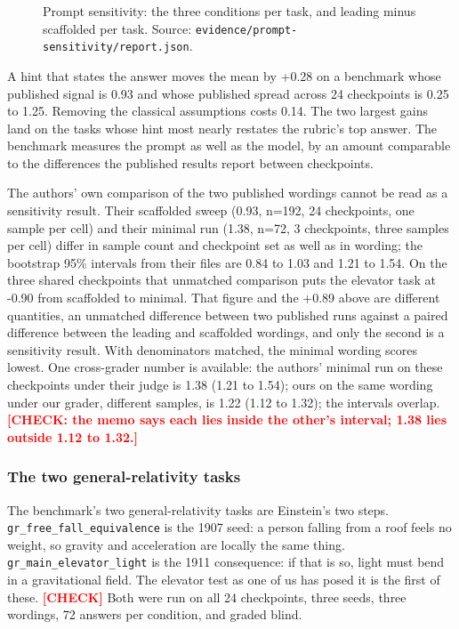 \documentclass[reprint,prx,amsmath,amssymb,aps,superscriptaddress]{revtex4-2}
\begin{document}
\begin{figure}[t]
\centering
{}
\caption{Prompt sensitivity: the three conditions per task, and leading minus scaffolded per task. Source: \texttt{evidence/prompt-sensitivity/report.json}.}
\label{fig:4}
\end{figure}

A hint that states the answer moves the mean by +0.28 on a benchmark whose published signal is 0.93 and whose published spread across 24 checkpoints is 0.25 to 1.25. Removing the classical assumptions costs 0.14. The two largest gains land on the tasks whose hint most nearly restates the rubric's top answer. The benchmark measures the prompt as well as the model, by an amount comparable to the differences the published results report between checkpoints.

The authors' own comparison of the two published wordings cannot be read as a sensitivity result. Their scaffolded sweep (0.93, n=192, 24 checkpoints, one sample per cell) and their minimal run (1.38, n=72, 3 checkpoints, three samples per cell) differ in sample count and checkpoint set as well as in wording; the bootstrap 95\% intervals from their files are 0.84 to 1.03 and 1.21 to 1.54. On the three shared checkpoints that unmatched comparison puts the elevator task at -0.90 from scaffolded to minimal. That figure and the +0.89 above are different quantities, an unmatched difference between two published runs against a paired difference between the leading and scaffolded wordings, and only the second is a sensitivity result. With denominators matched, the minimal wording scores lowest. One cross-grader number is available: the authors' minimal run on these checkpoints under their judge is 1.38 (1.21 to 1.54); ours on the same wording under our grader, different samples, is 1.22 (1.12 to 1.32); the intervals overlap. \textbf{\textcolor{red}{[CHECK: the memo says each lies inside the other's interval; 1.38 lies outside 1.12 to 1.32.]}}

\subsubsection{The two general-relativity tasks}

The benchmark's two general-relativity tasks are Einstein's two steps. \texttt{gr\_free\_fall\_equivalence} is the 1907 seed: a person falling from a roof feels no weight, so gravity and acceleration are locally the same thing. \texttt{gr\_main\_elevator\_light} is the 1911 consequence: if that is so, light must bend in a gravitational field. The elevator test as one of us has posed it is the first of these. \textbf{\textcolor{red}{[CHECK]}} Both were run on all 24 checkpoints, three seeds, three wordings, 72 answers per condition, and graded blind.
\end{document}
